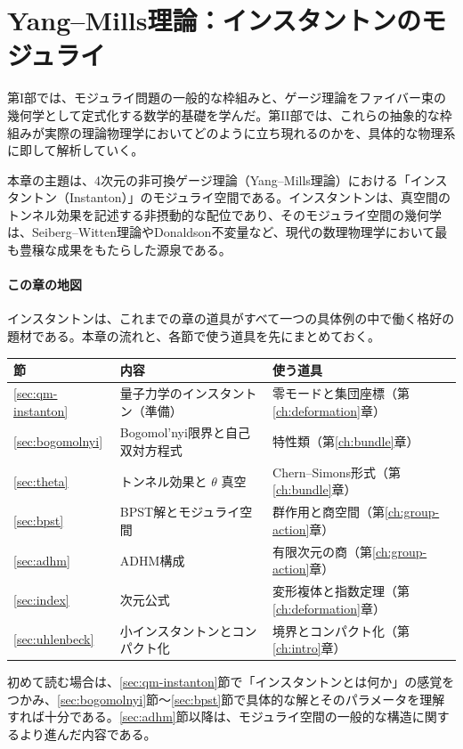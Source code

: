\documentclass[uplatex, dvipdfmx, book]{jsbook}
\let\origsection\section
\let\origsubsection\subsection
\let\origsubsubsection\subsubsection
\newcommand{\chapter}{\origsection}
\renewcommand{\section}{\origsubsection}
\renewcommand{\subsection}{\origsubsubsection}
\renewcommand{\subsubsection}{\paragraph}
\begin{document}
\chapter{Yang--Mills理論：インスタントンのモジュライ}
\label{ch:instanton}

第I部では、モジュライ問題の一般的な枠組みと、ゲージ理論をファイバー束の幾何学として定式化する数学的基礎を学んだ。第II部では、これらの抽象的な枠組みが実際の理論物理学においてどのように立ち現れるのかを、具体的な物理系に即して解析していく。

本章の主題は、4次元の非可換ゲージ理論（Yang--Mills理論）における「インスタントン（Instanton）」のモジュライ空間である。インスタントンは、真空間のトンネル効果を記述する非摂動的な配位であり、そのモジュライ空間の幾何学は、Seiberg--Witten理論やDonaldson不変量など、現代の数理物理学において最も豊穣な成果をもたらした源泉である。

\paragraph{この章の地図}
インスタントンは、これまでの章の道具がすべて一つの具体例の中で働く格好の題材である。本章の流れと、各節で使う道具を先にまとめておく。
\begin{center}
\begin{tabular}{lll}
    \hline
    節 & 内容 & 使う道具 \\
    \hline
    \ref{sec:qm-instanton} & 量子力学のインスタントン（準備） & 零モードと集団座標（第\ref{ch:deformation}章） \\
    \ref{sec:bogomolnyi} & Bogomol'nyi限界と自己双対方程式 & 特性類（第\ref{ch:bundle}章） \\
    \ref{sec:theta} & トンネル効果と $\theta$ 真空 & Chern--Simons形式（第\ref{ch:bundle}章） \\
    \ref{sec:bpst} & BPST解とモジュライ空間 & 群作用と商空間（第\ref{ch:group-action}章） \\
    \ref{sec:adhm} & ADHM構成 & 有限次元の商（第\ref{ch:group-action}章） \\
    \ref{sec:index} & 次元公式 & 変形複体と指数定理（第\ref{ch:deformation}章） \\
    \ref{sec:uhlenbeck} & 小インスタントンとコンパクト化 & 境界とコンパクト化（第\ref{ch:intro}章） \\
    \hline
\end{tabular}
\end{center}
初めて読む場合は、\ref{sec:qm-instanton}節で「インスタントンとは何か」の感覚をつかみ、\ref{sec:bogomolnyi}節〜\ref{sec:bpst}節で具体的な解とそのパラメータを理解すれば十分である。\ref{sec:adhm}節以降は、モジュライ空間の一般的な構造に関するより進んだ内容である。
\end{document}
